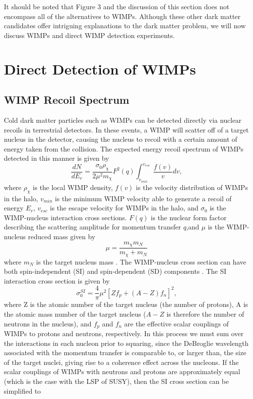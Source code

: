 \documentclass[a4paper,12pt]{article}
\begin{document}
It should be noted that Figure 3 and the discussion of this section does not encompass all of the alternatives to WIMPs.   Although these other dark matter candidates offer intriguing explanations to the dark matter problem, we will now discuss WIMPs and direct WIMP detection experiments.


\section{Direct Detection of WIMPs}

\subsection{WIMP Recoil Spectrum}
Cold dark matter particles such as WIMPs can be detected directly via nuclear recoils in terrestrial detectors.  In these events, a WIMP will scatter off of a target nucleus in the detector, causing the nucleus to recoil with a certain amount of energy taken from the collision.  The expected energy recoil spectrum of WIMPs detected in this manner is given by
\[\frac{dN}{dE_r}=\frac{\sigma_0 \rho_\chi}{2 \mu^2 m_\chi} F^2(q) \int_{v_{min}}^{v_{esc}} \frac{f(v)}{v} dv, \]
where $\rho_\chi$ is the local WIMP density, $f(v)$ is the velocity distribution of WIMPs in the halo, $v_{min}$ is the minimum WIMP velocity able to generate a recoil of energy $E_r$, $v_{esc}$ is the escape velocity for WIMPs in the halo, and  $\sigma_0$ is the WIMP-nucleus interaction cross sections. $F(q)$ is the nuclear form factor describing the scattering amplitude for momentum transfer $q$,and $\mu$ is the WIMP-nucleus reduced mass given by 
\[\mu=\frac{m_\chi m_N}{m_\chi + m_N}\]
where $m_N$ is the target nucleus mass \cite{Jungman,Goodman,Lewin}. The WIMP-nucleus cross section can have both spin-independent (SI) and spin-dependent (SD) components \cite{Shan}. The SI interaction cross section is given by
\[\sigma_0^{SI}=\frac{4}{\pi}\mu^2 [Z f_p + (A - Z) f_n]^2,\]
where Z is the atomic number of the target nucleus (the number of protons), A is the atomic mass number of the target nucleus ($A-Z$ is therefore the number of neutrons in the nucleus), and $f_p$ and $f_n$ are the effective scalar couplings of WIMPs to protons and neutrons, respectively.  In this process we must sum over the interactions in each nucleon prior to squaring, since the DeBroglie wavelength associated with the momentum transfer is comparable to, or larger than, the size of the target nuclei, giving rise to a coherence effect across the nucleons.  If the scalar couplings of WIMPs with neutrons and protons are approximately equal (which is the case with the LSP of SUSY), then the SI cross section can be simplified to
\end{document}
